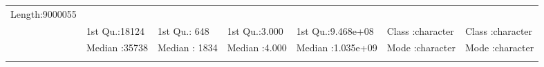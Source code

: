 \documentclass[
]{article}
\begin{document}
\begin{longtable}[]{@{}lllllll@{}}
\begin{minipage}[t]{0.14\columnwidth}
Length:9000055\strut
\end{minipage}\tabularnewline
\begin{minipage}[t]{0.02\columnwidth}\raggedright
\strut
\end{minipage} & \begin{minipage}[t]{0.12\columnwidth}\raggedright
1st Qu.:18124\strut
\end{minipage} & \begin{minipage}[t]{0.12\columnwidth}\raggedright
1st Qu.: 648\strut
\end{minipage} & \begin{minipage}[t]{0.12\columnwidth}\raggedright
1st Qu.:3.000\strut
\end{minipage} & \begin{minipage}[t]{0.15\columnwidth}\raggedright
1st Qu.:9.468e+08\strut
\end{minipage} & \begin{minipage}[t]{0.14\columnwidth}\raggedright
Class :character\strut
\end{minipage} & \begin{minipage}[t]{0.14\columnwidth}\raggedright
Class :character\strut
\end{minipage}\tabularnewline
\begin{minipage}[t]{0.02\columnwidth}\raggedright
\strut
\end{minipage} & \begin{minipage}[t]{0.12\columnwidth}\raggedright
Median :35738\strut
\end{minipage} & \begin{minipage}[t]{0.12\columnwidth}\raggedright
Median : 1834\strut
\end{minipage} & \begin{minipage}[t]{0.12\columnwidth}\raggedright
Median :4.000\strut
\end{minipage} & \begin{minipage}[t]{0.15\columnwidth}\raggedright
Median :1.035e+09\strut
\end{minipage} & \begin{minipage}[t]{0.14\columnwidth}\raggedright
Mode :character\strut
\end{minipage} & \begin{minipage}[t]{0.14\columnwidth}\raggedright
Mode :character\strut
\end{minipage}\tabularnewline
\begin{minipage}[t]{0.02\columnwidth}\raggedright
\strut
\end{minipage} & \begin{minipage}[t]{0.12\columnwidth}\raggedright

\end{minipage}
\end{longtable}
\end{document}
